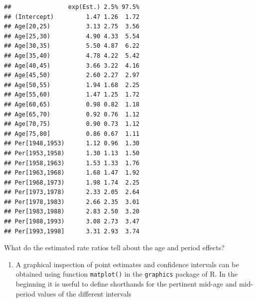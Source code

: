 \documentclass[
]{book}
\providecommand{\tightlist}{%
  \setlength{\itemsep}{0pt}\setlength{\parskip}{0pt}}
\theoremstyle{definition}
\theoremstyle{definition}
\theoremstyle{definition}
\theoremstyle{definition}
\theoremstyle{remark}
\begin{document}
\begin{verbatim}
##                exp(Est.) 2.5% 97.5%
## (Intercept)         1.47 1.26  1.72
## Age[20,25)          3.13 2.75  3.56
## Age[25,30)          4.90 4.33  5.54
## Age[30,35)          5.50 4.87  6.22
## Age[35,40)          4.78 4.22  5.42
## Age[40,45)          3.66 3.22  4.16
## Age[45,50)          2.60 2.27  2.97
## Age[50,55)          1.94 1.68  2.25
## Age[55,60)          1.47 1.25  1.72
## Age[60,65)          0.98 0.82  1.18
## Age[65,70)          0.92 0.76  1.12
## Age[70,75)          0.90 0.73  1.12
## Age[75,80]          0.86 0.67  1.11
## Per[1948,1953)      1.12 0.96  1.30
## Per[1953,1958)      1.30 1.13  1.50
## Per[1958,1963)      1.53 1.33  1.76
## Per[1963,1968)      1.68 1.47  1.92
## Per[1968,1973)      1.98 1.74  2.25
## Per[1973,1978)      2.33 2.05  2.64
## Per[1978,1983)      2.66 2.35  3.01
## Per[1983,1988)      2.83 2.50  3.20
## Per[1988,1993)      3.08 2.73  3.47
## Per[1993,1998]      3.31 2.93  3.74
\end{verbatim}

What do the estimated rate ratios tell about the age and period effects?

\begin{enumerate}
\def\labelenumi{\arabic{enumi}.}
\setcounter{enumi}{1}
\tightlist
\item
  A graphical inspection of point estimates and confidence intervals
  can be obtained using function \texttt{matplot()} in the \texttt{graphics} package
  of R. In the beginning it is useful to define shorthands for the
  pertinent mid-age and mid-period values of the different intervals
\end{enumerate}
\end{document}
